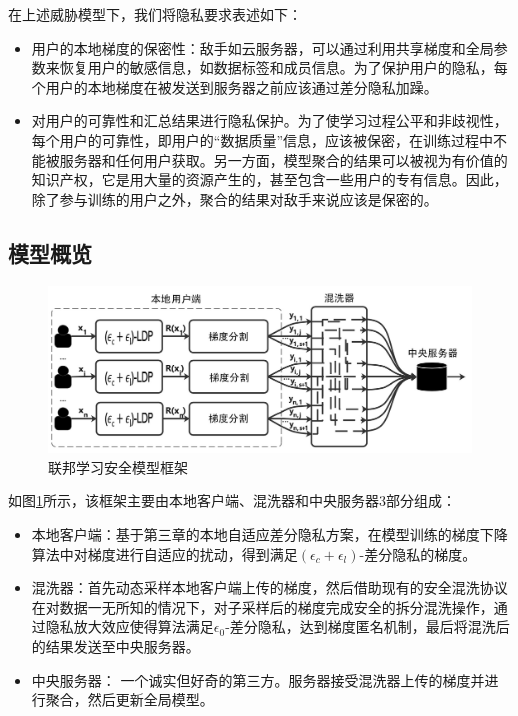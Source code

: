 在上述威胁模型下，我们将隐私要求表述如下：
\begin{itemize}
  \item 用户的本地梯度的保密性：敌手如云服务器，可以通过利用共享梯度和全局参数来恢复用户的敏感信息，如数据标签和成员信息。为了保护用户的隐私，每个用户的本地梯度在被发送到服务器之前应该通过差分隐私加躁。
  \item 对用户的可靠性和汇总结果进行隐私保护。为了使学习过程公平和非歧视性，每个用户的可靠性，即用户的“数据质量”信息，应该被保密，在训练过程中不能被服务器和任何用户获取。另一方面，模型聚合的结果可以被视为有价值的知识产权，它是用大量的资源产生的，甚至包含一些用户的专有信息。因此，除了参与训练的用户之外，聚合的结果对敌手来说应该是保密的。
\end{itemize}

\subsection{模型概览}
\begin{figure}[!hbt]
\centering
	\includegraphics[scale=0.5]{fig2/C4/shuffle1}%
	\caption{联邦学习安全模型框架}
	\label{fig:联邦学习安全模型框架}	
\end{figure}

如图\ref{fig:联邦学习安全模型框架}所示，该框架主要由本地客户端、混洗器和中央服务器3部分组成：
\begin{itemize}
  \item 本地客户端：基于第三章的本地自适应差分隐私方案，在模型训练的梯度下降算法中对梯度进行自适应的扰动，得到满足$\left(\epsilon_{c}+\epsilon_{l}\right)$-差分隐私的梯度。
  \item 混洗器：首先动态采样本地客户端上传的梯度，然后借助现有的安全混洗协议在对数据一无所知的情况下，对子采样后的梯度完成安全的拆分混洗操作，通过隐私放大效应使得算法满足$\epsilon_{0}$-差分隐私，达到梯度匿名机制，最后将混洗后的结果发送至中央服务器。
  \item 中央服务器： 一个诚实但好奇的第三方。服务器接受混洗器上传的梯度并进行聚合，然后更新全局模型。
\end{itemize}


